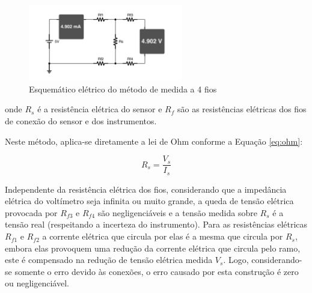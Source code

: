 \documentclass[a4paper]{instrumentacao}
\begin{document}
\begin{figure}[H]
\centering
\includegraphics[width=0.6\textwidth]{4WireMeasure.pdf}
\caption{Esquemático elétrico do método de medida a 4 fios}
\label{fig:4wire-circuit}
\end{figure}

\noindent onde $R_s$ é a resistência elétrica do sensor e $R_f$ são as resistências elétricas dos fios de conexão do sensor e dos instrumentos.

Neste método, aplica-se diretamente a lei de Ohm conforme a Equação \ref{eq:ohm}:

\begin{equation}
	R_s = \frac{V_s}{I_s}
	\label{eq:ohm}
\end{equation}

Independente da resistência elétrica dos fios, considerando que a impedância elétrica do voltímetro seja infinita ou muito grande, a queda de tensão elétrica provocada por $R_{f3}$ e $R_{f4}$ são negligenciáveis e a tensão medida sobre $R_s$ é a tensão real (respeitando a incerteza do instrumento). Para as resistências elétricas $R_{f1}$ e $R_{f2}$ a corrente elétrica que circula por elas é a mesma que circula por $R_s$, embora elas provoquem uma redução da corrente elétrica que circula pelo ramo, este é compensado na redução de tensão elétrica medida $V_s$. Logo, considerando-se somente o erro devido às conexões, o erro causado por esta construção é zero ou negligenciável.




\end{document}
